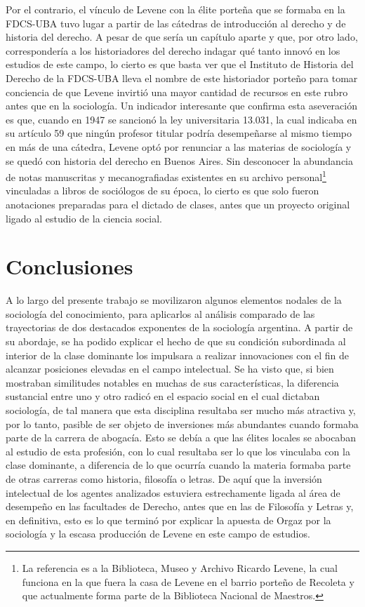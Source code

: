 Por el contrario, el vínculo de Levene con la élite porteña que se formaba en la FDCS-UBA tuvo lugar a partir de las cátedras de introducción al derecho y de historia del derecho. A pesar de que sería un capítulo aparte y que, por otro lado, correspondería a los historiadores del derecho indagar qué tanto innovó en los estudios de este campo, lo cierto es que basta ver que el Instituto de Historia del Derecho de la FDCS-UBA lleva el nombre de este historiador porteño para tomar conciencia de que Levene invirtió una mayor cantidad de recursos en este rubro antes que en la sociología. Un indicador interesante que confirma esta aseveración es que, cuando en 1947 se sancionó la ley universitaria 13.031, la cual indicaba en su artículo 59 que ningún profesor titular podría desempeñarse al mismo tiempo en más de una cátedra, Levene optó por renunciar a las materias de sociología y se quedó con historia del derecho en Buenos Aires. Sin desconocer la abundancia de notas manuscritas y mecanografiadas existentes en su archivo personal\footnote{La referencia es a la Biblioteca, Museo y Archivo Ricardo Levene, la cual funciona en la que fuera la casa de Levene en el barrio porteño de Recoleta y que actualmente forma parte de la Biblioteca Nacional de Maestros.} vinculadas a libros de sociólogos de su época, lo cierto es que solo fueron anotaciones preparadas para el dictado de clases, antes que un proyecto original ligado al estudio de la ciencia social.

\section{Conclusiones}

A lo largo del presente trabajo se movilizaron algunos elementos nodales de la sociología del conocimiento, para aplicarlos al análisis comparado de las trayectorias de dos destacados exponentes de la sociología argentina. A partir de su abordaje, se ha podido explicar el hecho de que su condición subordinada al interior de la clase dominante los impulsara a realizar innovaciones con el fin de alcanzar posiciones elevadas en el campo intelectual. Se ha visto que, si bien mostraban similitudes notables en muchas de sus características, la diferencia sustancial entre uno y otro radicó en el espacio social en el cual dictaban sociología, de tal manera que esta disciplina resultaba ser mucho más atractiva y, por lo tanto, pasible de ser objeto de inversiones más abundantes cuando formaba parte de la carrera de abogacía. Esto se debía a que las élites locales se abocaban al estudio de esta profesión, con lo cual resultaba ser lo que los vinculaba con la clase dominante, a diferencia de lo que ocurría cuando la materia formaba parte de otras carreras como historia, filosofía o letras. De aquí que la inversión intelectual de los agentes analizados estuviera estrechamente ligada al área de desempeño en las facultades de Derecho, antes que en las de Filosofía y Letras y, en definitiva, esto es lo que terminó por explicar la apuesta de Orgaz por la sociología y la escasa producción de Levene en este campo de estudios.

